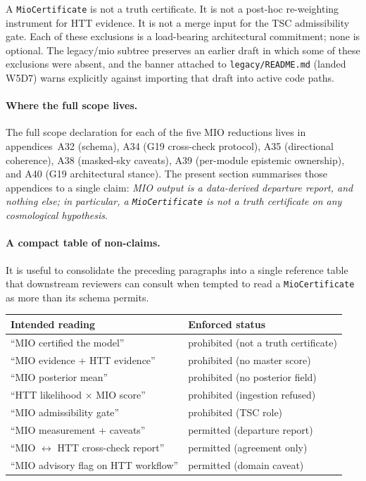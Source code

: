 A \texttt{MioCertificate} is not a truth certificate.  It
is not a post-hoc re-weighting instrument for HTT
evidence.  It is not a merge input for the TSC
admissibility gate.  Each of these exclusions is a
load-bearing architectural commitment; none is optional.
The legacy/mio subtree preserves an earlier draft in which
some of these exclusions were absent, and the banner
attached to \texttt{legacy/README.md} (landed W5D7) warns
explicitly against importing that draft into active code
paths.

\paragraph{Where the full scope lives.}

The full scope declaration for each of the five MIO
reductions lives in appendices~A32 (schema), A34 (G19
cross-check protocol), A35 (directional coherence), A38
(masked-sky caveats), A39 (per-module epistemic
ownership), and A40 (G19 architectural stance).  The
present section summarises those appendices to a single
claim: \emph{MIO output is a data-derived departure
report, and nothing else; in particular, a
\texttt{MioCertificate} is not a truth certificate on
any cosmological hypothesis}.


\paragraph{A compact table of non-claims.}

It is useful to consolidate the preceding paragraphs into a
single reference table that downstream reviewers can
consult when tempted to read a \texttt{MioCertificate} as
more than its schema permits.

\begin{center}
\small
\begin{tabular}{ll}
\hline\hline
Intended reading & Enforced status \\
\hline
``MIO certified the model''
  & prohibited (not a truth certificate) \\
``MIO evidence + HTT evidence''
  & prohibited (no master score) \\
``MIO posterior mean''
  & prohibited (no posterior field) \\
``HTT likelihood $\times$ MIO score''
  & prohibited (ingestion refused) \\
``MIO admissibility gate''
  & prohibited (TSC role) \\
\hline
``MIO measurement + caveats''
  & permitted (departure report) \\
``MIO $\leftrightarrow$ HTT cross-check report''
  & permitted (agreement only) \\
``MIO advisory flag on HTT workflow''
  & permitted (domain caveat) \\
\hline\hline
\end{tabular}
\end{center}

